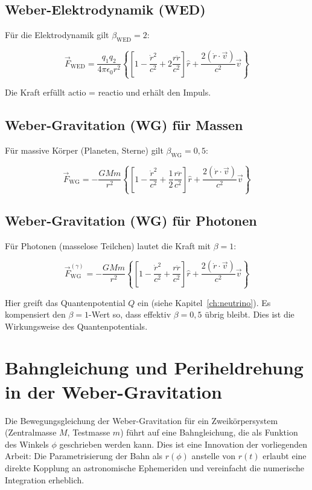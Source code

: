 \subsection{Weber-Elektrodynamik (WED)}
\label{sub:weber_wed}

Für die Elektrodynamik gilt \(\beta_{\text{WED}} = 2\):

\[
\vec{F}_{\text{WED}} = \frac{q_1 q_2}{4\pi\epsilon_0 r^2} \left\{ \left[ 1 - \frac{\dot{r}^2}{c^2} + 2 \frac{r\ddot{r}}{c^2} \right] \hat{r} + \frac{2(\dot{r} \cdot \vec{v})}{c^2} \vec{v} \right\}
\]

Die Kraft erfüllt actio = reactio und erhält den Impuls.

\subsection{Weber-Gravitation (WG) für Massen}
\label{sub:weber_wg_massen}

Für massive Körper (Planeten, Sterne) gilt \(\beta_{\text{WG}} = 0,5\):

\[
\vec{F}_{\text{WG}} = -\frac{GMm}{r^2} \left\{ \left[ 1 - \frac{\dot{r}^2}{c^2} + \frac{1}{2} \frac{r\ddot{r}}{c^2} \right] \hat{r} + \frac{2(\dot{r} \cdot \vec{v})}{c^2} \vec{v} \right\}
\]

\subsection{Weber-Gravitation (WG) für Photonen}
\label{sub:weber_wg_photonen}

Für Photonen (masselose Teilchen) lautet die Kraft mit \(\beta = 1\):

\[
\vec{F}_{\text{WG}}^{(\gamma)} = -\frac{GMm}{r^2} \left\{ \left[ 1 - \frac{\dot{r}^2}{c^2} + \frac{r\ddot{r}}{c^2} \right] \hat{r} + \frac{2(\dot{r} \cdot \vec{v})}{c^2} \vec{v} \right\}
\]

Hier greift das Quantenpotential \(Q\) ein (siehe Kapitel~\ref{ch:neutrino}). Es kompensiert den \(\beta = 1\)-Wert so, dass effektiv \(\beta = 0,5\) übrig bleibt. Dies ist die Wirkungsweise des Quantenpotentials.

\section{Bahngleichung und Periheldrehung in der Weber-Gravitation}
\label{sec:weber_bahngleichung}

Die Bewegungsgleichung der Weber-Gravitation für ein Zweikörpersystem (Zentralmasse \(M\), Testmasse \(m\)) führt auf eine Bahngleichung, die als Funktion des Winkels \(\phi\) geschrieben werden kann. Dies ist eine Innovation der vorliegenden Arbeit: Die Parametrisierung der Bahn als \(r(\phi)\) anstelle von \(r(t)\) erlaubt eine direkte Kopplung an astronomische Ephemeriden und vereinfacht die numerische Integration erheblich.

